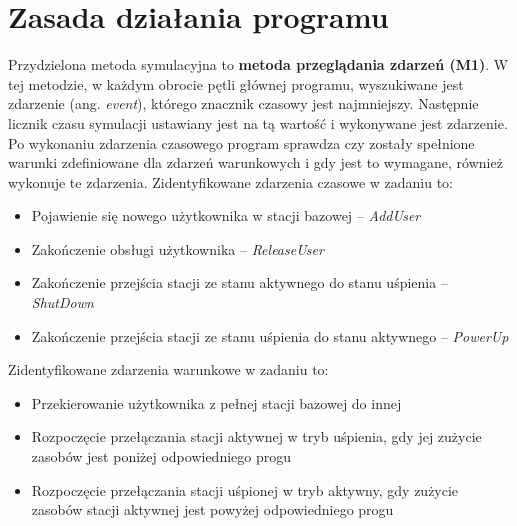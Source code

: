\newpage
\section{Zasada działania programu}
Przydzielona metoda symulacyjna to \textbf{metoda przeglądania zdarzeń (M1)}. W tej metodzie, w każdym obrocie pętli głównej programu, wyszukiwane jest zdarzenie (ang. \emph{event}), którego znacznik czasowy jest najmniejszy. Następnie licznik czasu symulacji ustawiany jest na tą wartość i wykonywane jest zdarzenie. Po wykonaniu zdarzenia czasowego program sprawdza czy zostały spełnione warunki zdefiniowane dla zdarzeń warunkowych i gdy jest to wymagane, również wykonuje te zdarzenia. 
\newline\newline
\noindent Zidentyfikowane zdarzenia czasowe w zadaniu to:
\begin{itemize}
\item Pojawienie się nowego użytkownika w stacji bazowej -- \emph{AddUser}
\item Zakończenie obsługi użytkownika -- \emph{ReleaseUser}
\item Zakończenie przejścia stacji ze stanu aktywnego do stanu uśpienia -- \emph{ShutDown}
\item Zakończenie przejścia stacji ze stanu uśpienia do stanu aktywnego -- \emph{PowerUp}
\end{itemize}

\noindent Zidentyfikowane zdarzenia warunkowe w zadaniu to:
\begin{itemize}
\item Przekierowanie użytkownika z pełnej stacji bazowej do innej
\item Rozpoczęcie przełączania stacji aktywnej w tryb uśpienia, gdy jej zużycie zasobów jest poniżej odpowiedniego progu
\item Rozpoczęcie przełączania stacji uśpionej w tryb aktywny, gdy zużycie zasobów stacji aktywnej jest powyżej odpowiedniego progu
\end{itemize}

